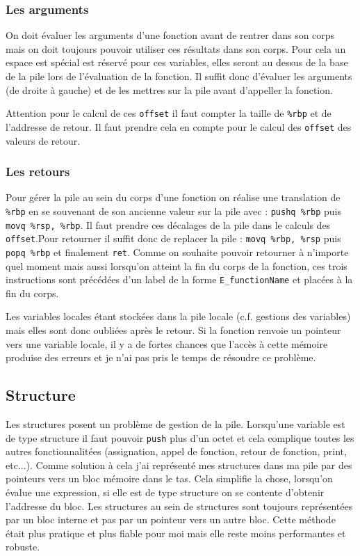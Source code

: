\documentclass[9pt,a4paper]{article}
\begin{document}
\subsubsection*{Les arguments}

On doit évaluer les arguments d'une fonction avant de rentrer dans son corps mais on doit toujours pouvoir utiliser ces résultats dans son corps. Pour cela un espace est spécial est réservé pour ces variables, elles seront au dessus de la base de la pile lors de l'évaluation de la fonction. Il suffit donc d'évaluer les arguments (de droite à gauche) et de les mettres sur la pile avant d'appeller la fonction.

Attention pour le calcul de ces \verb|offset| il faut compter la taille de \verb|%rbp| et de l'addresse de retour. Il faut prendre cela en compte pour le calcul des \verb|offset| des valeurs de retour.

\subsubsection*{Les retours}

Pour gérer la pile au sein du corps d'une fonction on réalise une translation de \verb|%rbp| en se souvenant de son ancienne valeur sur la pile avec : \verb|pushq %rbp| puis \verb|movq %rsp, %rbp|. Il faut prendre ces décalages de la pile dans le calculs des \verb|offset|.Pour retourner il suffit donc de replacer la pile : \verb|movq %rbp, %rsp| puis \verb|popq %rbp| et finalement \verb|ret|. Comme on souhaite pouvoir retourner à n'importe quel moment mais aussi lorsqu'on atteint la fin du corps de la fonction, ces trois instructions sont précédées d'un label de la forme \verb|E_functionName| et placées à la fin du corps.

Les variables locales étant stockées dans la pile locale (c.f. gestions des variables) mais elles sont donc oubliées après le retour. Si la fonction renvoie un pointeur vers une variable locale, il y a de fortes chances que l'accès à cette mémoire produise des erreurs et je n'ai pas pris le temps de résoudre ce problème.

\subsection{Structure}

Les structures posent un problème de gestion de la pile. Lorsqu'une variable est de type structure il faut pouvoir \verb|push| plus d'un octet et cela complique toutes les autres fonctionnalitées (assignation, appel de fonction, retour de fonction, print, etc...). Comme solution à cela j'ai représenté mes structures dans ma pile par des pointeurs vers un bloc mémoire dans le tas. Cela simplifie la chose, lorsqu'on évalue une expression, si elle est de type structure on se contente d'obtenir l'addresse du bloc. Les structures au sein de structures sont toujours représentées par un bloc interne et pas par un pointeur vers un autre bloc. Cette méthode était plus pratique et plus fiable pour moi mais elle reste moins performantes et robuste.
\end{document}
